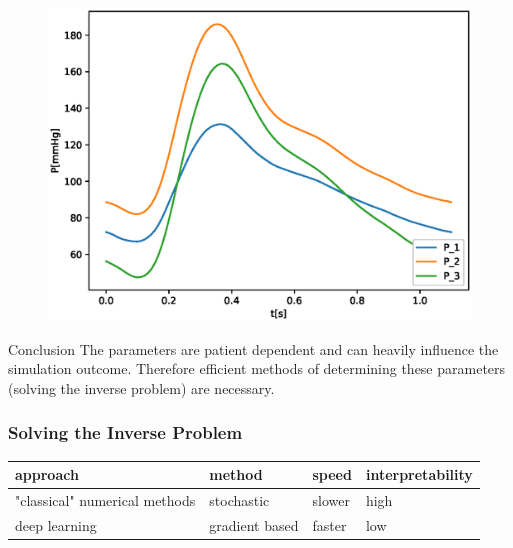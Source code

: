 \documentclass{beamer}
\begin{document}
\begin{frame}
\begin{figure}
\begin{center}
\begin{minipage}[t][0.35\paperheight][t]{\textwidth}
\begin{minipage}{0.44\textwidth}
				\includegraphics[width=\textwidth]{images/compare_output_params_P_P.eps}
			\end{minipage}
		\end{minipage}
		\end{center}
	\end{figure}
\begin{minipage}[t][0.45\paperheight][t]{\textwidth}
	\hfill
	\begin{block}{Conclusion}
		The parameters are patient dependent and can heavily influence the simulation outcome. Therefore efficient methods of determining these parameters (solving the inverse problem) are necessary.
	\end{block}
		\end{minipage}
\end{frame}

\begin{frame}
	\frametitle{Solving the Inverse Problem}
\begin{minipage}[t][0.35\paperheight][t]{\textwidth}
\begin{tabular}{| m{2cm} | m{2cm}| m{2cm} | m{2.4cm} | } 
	\hline
	approach & method & speed & interpretability\\ 
	\hline
	\hline
	"classical" numerical methods & stochastic & slower & high \\ 
	\hline
	deep learning & gradient based & faster & low \\ 
	\hline
\end{tabular}
\end{minipage}
\hfill
\begin{minipage}[t][0.35\paperheight][t]{\textwidth}
\end{minipage}
\end{frame}
\end{document}
